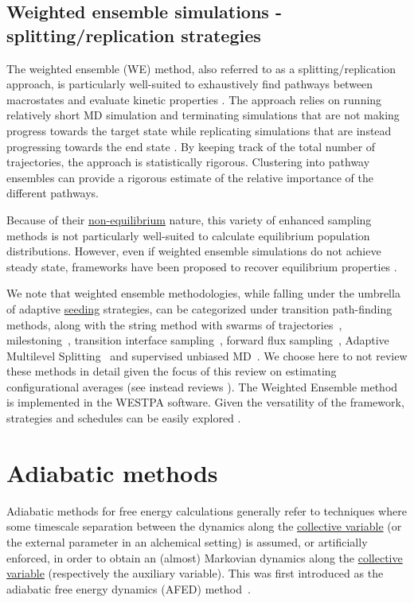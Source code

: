 \documentclass[9pt,review]{livecoms}
\begin{document}
\subsection{Weighted ensemble simulations - splitting/replication strategies}

The weighted ensemble (WE) method, also referred to as a splitting/replication approach, is particularly well-suited to exhaustively find pathways between macrostates and evaluate kinetic properties \cite{HUBER199697}. The approach relies on running relatively short MD simulation and terminating simulations that are not making progress towards the target state while replicating simulations that are instead progressing towards the end state \cite{doi:10.1146/annurev-biophys-070816-033834}. By keeping track of the total number of trajectories, the approach is statistically rigorous. Clustering into pathway ensembles can provide a rigorous estimate of the relative importance of the different pathways.

Because of their \hyperlink{ref:OutOfEq} {non-equilibrium} nature, this variety of enhanced sampling methods is not particularly well-suited to calculate equilibrium population distributions. However, even if weighted ensemble simulations do not achieve steady state, frameworks have been proposed to recover equilibrium properties \cite{doi:10.1063/1.3456985,doi:10.1021/ct401065r,doi:10.1021/jacs.8b10735}.

We note that weighted ensemble methodologies, while falling under the umbrella of adaptive \hyperlink{ref:Seeding} {seeding} strategies, can be categorized under transition path-finding methods, along with the string method with swarms of trajectories~\cite{doi:10.1021/jp0777059}, milestoning~\cite{doi:10.1063/1.1738640}, transition interface sampling~\cite{doi:10.1063/1.1562614}, forward flux sampling~\cite{PhysRevLett.94.018104}, Adaptive Multilevel Splitting~\cite{cerou-guyader-lelievre-pommier-11,teo-mayne-schulten-lelievre-16} and supervised unbiased MD~\cite{doi:10.1021/acs.jcim.9b01094, doi:10.1021/acs.jcim.5b00702}. We choose here to not review these methods in detail given the focus of this review on estimating configurational averages (see instead reviews \cite{doi:10.1146/annurev.physchem.040808.090412, doi:10.1146/annurev.physchem.53.082301.113146, doi:10.1063/1.5127780}).
The Weighted Ensemble method is implemented in the WESTPA software. Given the versatility of the framework, strategies and schedules can be easily explored \cite{Bogetti2019Suite}.

\section{Adiabatic methods}
\label{sec:adiab}
Adiabatic methods for free energy calculations generally refer to techniques where some timescale separation between the dynamics along the \hyperlink{ref:CV} {collective variable} (or the external parameter in an alchemical setting) is assumed, or artificially enforced, in order to obtain an (almost) Markovian dynamics along the \hyperlink{ref:CV} {collective variable} (respectively the auxiliary variable). This was first introduced as the adiabatic free energy dynamics (AFED) method~\cite{doi:10.1063/1.1448491}.
\end{document}
